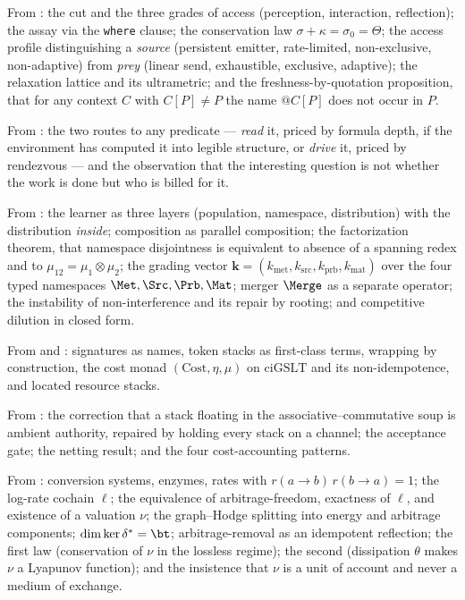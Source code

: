 From \chSci: the cut and the three grades of access (perception,
interaction, reflection); the assay via the \texttt{where} clause; the
conservation law $\sigma + \kappa = \sigma_0 = \Theta$; the access profile
distinguishing a \emph{source} (persistent emitter, rate-limited,
non-exclusive, non-adaptive) from \emph{prey} (linear send, exhaustible,
exclusive, adaptive); the relaxation lattice and its ultrametric; and the
freshness-by-quotation proposition, that for any context $C$ with
$C[P] \neq P$ the name $@C[P]$ does not occur in $P$.

From \chGame: the two routes to any predicate --- \emph{read} it,
priced by formula depth, if the environment has computed it into legible
structure, or \emph{drive} it, priced by rendezvous --- and the observation
that the interesting question is not whether the work is done but who is
billed for it.

From \chComp: the learner as three layers (population, namespace,
distribution) with the distribution \emph{inside}; composition as parallel
composition; the factorization theorem, that namespace disjointness is
equivalent to absence of a spanning redex and to $\mu_{12} =
\mu_1 \otimes \mu_2$; the grading vector
$\mathbf{k} = (k_{\mathrm{met}}, k_{\mathrm{src}}, k_{\mathrm{prb}},
k_{\mathrm{mat}})$ over the four typed namespaces $\Met, \Src, \Prb, \Mat$;
merger $\Merge$ as a separate operator; the instability of non-interference
and its repair by rooting; and competitive dilution in closed form.

From \cite{CARho} and \cite{CE}: signatures as names, token stacks as
first-class terms, wrapping by construction, the cost monad
$(\mathrm{Cost}, \eta, \mu)$ on $\mathrm{ciGSLT}$ and its non-idempotence,
and located resource stacks.

From \cite{finrho}: the correction that a stack floating in the
associative--commutative soup is ambient authority, repaired by holding
every stack on a channel; the acceptance gate; the netting result; and the
four cost-accounting patterns.

From \cite{vtok}: conversion systems, enzymes, rates with
$r(a{\to}b)\,r(b{\to}a) = 1$; the log-rate cochain $\ell$; the equivalence
of arbitrage-freedom, exactness of $\ell$, and existence of a valuation
$\nu$; the graph--Hodge splitting into energy and arbitrage components;
$\dim\ker\delta^\ast = \bt$; arbitrage-removal as an idempotent reflection;
the first law (conservation of $\nu$ in the lossless regime); the second
(dissipation $\theta$ makes $\nu$ a Lyapunov function); and the insistence
that $\nu$ is a unit of account and never a medium of exchange.

